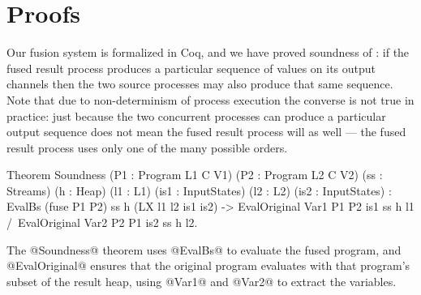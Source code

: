 
\section{Proofs}
\label{s:Proofs}

Our fusion system is formalized in Coq, and we have proved soundness of : if the fused result process produces a particular sequence of values on its output channels then the two source processes may also produce that same sequence. Note that due to non-determinism of process execution the converse is not true in practice: just because the two concurrent processes can produce a particular output sequence does not mean the fused result process will as well --- the fused result process uses only one of the many possible orders. 


\begin{code}
Theorem Soundness (P1 : Program L1 C V1)
                  (P2 : Program L2 C V2)
                  (ss : Streams) (h : Heap)
                  (l1 : L1) (is1 : InputStates)
                  (l2 : L2) (is2 : InputStates) 
  :  EvalBs (fuse P1 P2) ss h (LX l1 l2 is1 is2)
  -> EvalOriginal Var1 P1 P2 is1 ss h l1
  /\ EvalOriginal Var2 P2 P1 is2 ss h l2.
\end{code}

The @Soundness@ theorem uses @EvalBs@ to evaluate the fused program, and @EvalOriginal@ ensures that the original program evaluates with that program's subset of the result heap, using @Var1@ and @Var2@ to extract the variables.


